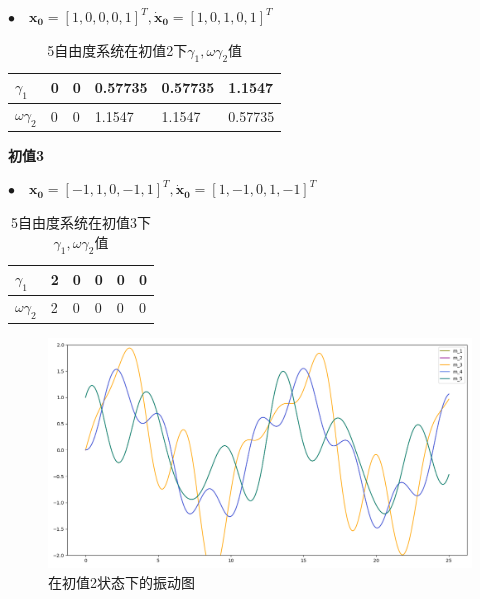 \documentclass[11pt, a4paper, oneside]{ctexart}
\begin{document}
{{{$\bullet\quad\boldsymbol{x_0}=[1,0,0,0,1]^T,
\boldsymbol{\dot x_0}=[1,0,1,0,1]^T
$

\begin{table}[h]
    \centering
    \caption{5自由度系统在初值2下$\gamma_1,\omega\gamma_2值$}

    \begin{tabular}{@{}p{1cm}<{\centering}p{2cm}<{\centering}p{2cm}<{\centering}p{2cm}<{\centering}p{2cm}<{\centering}p{2cm}<{\centering}@{}}
    \toprule
    $\gamma_1$       & 0 & 0 & 0.57735 & 0.57735 & 1.1547 \\ \midrule
    $\omega\gamma_2$ & 0   & 0   & 1.1547         &    1.1547       & 0.57735        \\ \bottomrule
    \end{tabular}
    \end{table}
    \vspace{2mm}
    \textbf{初值3}

    $\bullet\quad\boldsymbol{x_0}=[-1,1,0,-1,1]^T,
    \boldsymbol{\dot x_0}=[1,-1,0,1,-1]^T
    $

    \begin{table}[h]
        \caption{5自由度系统在初值3下$\gamma_1,\omega\gamma_2值$}
        \centering
        \begin{tabular}{@{}p{1cm}<{\centering}p{2cm}<{\centering}p{2cm}<{\centering}p{2cm}<{\centering}p{2cm}<{\centering}p{2cm}<{\centering}@{}}
        \toprule
        $\gamma_1$       & 2 & 0 & 0 & 0 & 0 \\ \midrule
        $\omega\gamma_2$ & 2   & 0   & 0        &    0       & 0     \\ \bottomrule
        \end{tabular}
        \end{table}


    \begin{figure}[h]
        
        \centering
        \vspace{2mm}
        \includegraphics[scale=0.4]{1,0,1,0,1.png}
        \caption{在初值2状态下的振动图 }
    \end{figure} 

}}}
\end{document}
